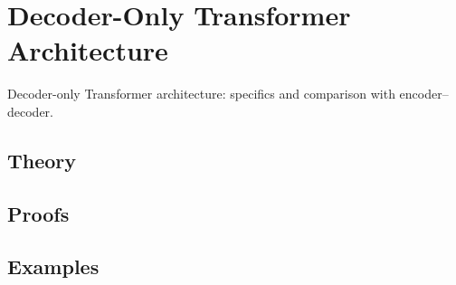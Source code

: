 
\section{Decoder-Only Transformer Architecture}
\label{sec:2.5.05-decoder-only-transformer}

\begin{ticket}
Decoder-only Transformer architecture: specifics and comparison with encoder–decoder.
\end{ticket}

\subsection*{Theory}

\subsection*{Proofs}

\subsection*{Examples}
